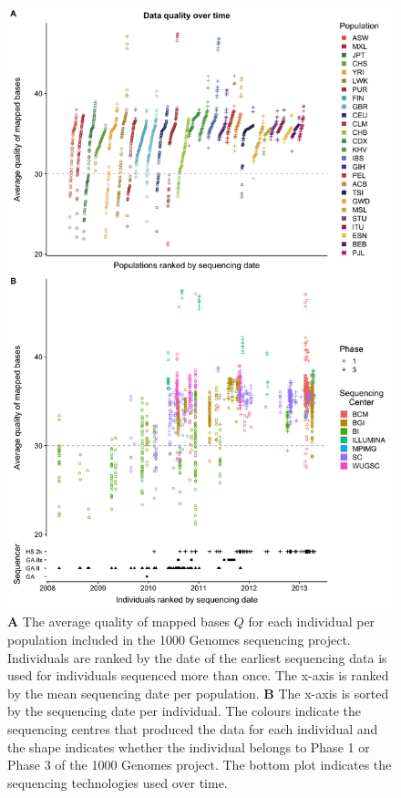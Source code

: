 \documentclass[9pt,lineno]{elife}
\begin{document}
\begin{figure}
\includegraphics[width=0.95\hsize,keepaspectratio]{./Figures/MapQualOverTime.jpg}

\caption{\textbf{A} The average quality of mapped bases $Q$ for each individual per population included in the 1000 Genomes sequencing project. Individuals are ranked by the date of the earliest sequencing data is used for individuals sequenced more than once. The x-axis is ranked by the mean sequencing date per population. \textbf{B} The x-axis is sorted by the sequencing date per individual. The colours indicate the sequencing centres that produced the data for each individual and the shape indicates whether the individual belongs to Phase 1 or Phase 3 of the 1000 Genomes project. The bottom plot indicates the sequencing technologies used over time.}
\label{MapQual}
\end{figure}
\end{document}
